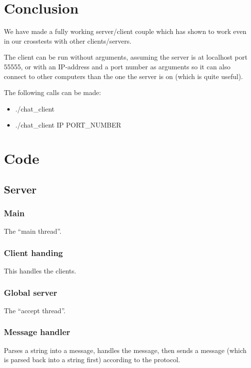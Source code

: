 \documentclass[a4paper]{article}
\begin{document}
\section{Conclusion}
We have made a fully working server/client couple which has shown to work even
in our crosstests with other clients/servers.

The client can be run without arguments, assuming the server is at localhost
port 55555, or with an IP-address and a port number as arguments so it can also
connect to other computers than the one the server is on (which is quite
useful).

The following calls can be made:
\begin{itemize}
\item ./chat\_client
\item ./chat\_client IP PORT\_NUMBER
\end{itemize}

\section{Code}
\subsection{Server}
\subsubsection{Main}
The ``main thread''.




\subsubsection{Client handing}
This handles the clients.


\subsubsection{Global server}
The ``accept thread''.


\subsubsection{Message handler}
Parses a string into a message, handles the message, then sends a message
(which is parsed back into a string first) according to the protocol.

\end{document}
